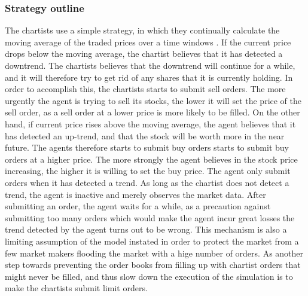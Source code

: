 \subsubsection{Strategy outline}
The chartists use a simple strategy, in which they continually calculate the moving average of the traded prices over a time windows \cite{izumi2009evaluation}. If the current price drops below the moving average, the chartist believes that it has detected a downtrend. The chartists believes that the downtrend will continue for a while, and it will therefore try to get rid of any shares that it is currently holding. In order to accomplish this, the chartists starts to submit sell orders. The more urgently the agent is trying to sell its stocks, the lower it will set the price of the sell order, as a sell order at a lower price is more likely to be filled. On the other hand, if current price rises above the moving average, the agent believes that it has detected an up-trend, and that the stock will be worth more in the near future. The agents therefore starts to submit buy orders starts to submit buy orders at a higher price. The more strongly the agent believes in the stock price increasing, the higher it is willing to set the buy price. The agent only submit orders when it has detected a trend. As long as the chartist does not detect a trend, the agent is inactive and merely observes the market data.  After submitting an order, the agent waits for a while, as a precaution against submitting too many orders which would make the agent incur great losses the trend detected by the agent turns out to be wrong. This mechanism is also a limiting assumption of the model instated in order to protect the market from a few market makers flooding the market with a hige number of orders. As another step towards preventing the order books from filling up with chartist orders that might never be filled, and thus slow down the execution of the simulation is to make the chartists submit limit orders.

